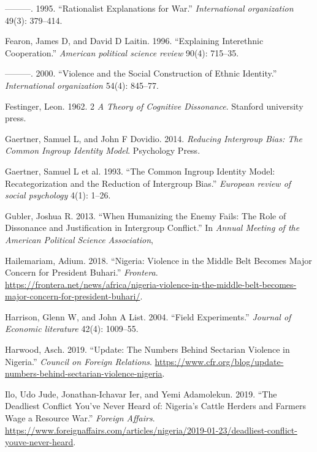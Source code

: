 \documentclass[11pt]{article}
\begin{document}
\begin{cslreferences}
\leavevmode\hypertarget{ref-fearon1995rationalist}{}%
---------. 1995. ``Rationalist Explanations for War.''
\emph{International organization} 49(3): 379--414.

\leavevmode\hypertarget{ref-fearon1996explaining}{}%
Fearon, James D, and David D Laitin. 1996. ``Explaining Interethnic
Cooperation.'' \emph{American political science review} 90(4): 715--35.

\leavevmode\hypertarget{ref-fearon2000violence}{}%
---------. 2000. ``Violence and the Social Construction of Ethnic
Identity.'' \emph{International organization} 54(4): 845--77.

\leavevmode\hypertarget{ref-festinger1962cognitiveDissonance}{}%
Festinger, Leon. 1962. 2 \emph{A Theory of Cognitive Dissonance}.
Stanford university press.

\leavevmode\hypertarget{ref-gaertner2014reducing}{}%
Gaertner, Samuel L, and John F Dovidio. 2014. \emph{Reducing Intergroup
Bias: The Common Ingroup Identity Model}. Psychology Press.

\leavevmode\hypertarget{ref-gaertner1993common}{}%
Gaertner, Samuel L et al. 1993. ``The Common Ingroup Identity Model:
Recategorization and the Reduction of Intergroup Bias.'' \emph{European
review of social psychology} 4(1): 1--26.

\leavevmode\hypertarget{ref-gubler2013humanizing}{}%
Gubler, Joshua R. 2013. ``When Humanizing the Enemy Fails: The Role of
Dissonance and Justification in Intergroup Conflict.'' In \emph{Annual
Meeting of the American Political Science Association},

\leavevmode\hypertarget{ref-frontera2018nigeria}{}%
Hailemariam, Adium. 2018. ``Nigeria: Violence in the Middle Belt Becomes
Major Concern for President Buhari.'' \emph{Frontera}.
\url{https://frontera.net/news/africa/nigeria-violence-in-the-middle-belt-becomes-major-concern-for-president-buhari/}.

\leavevmode\hypertarget{ref-harrison2004field}{}%
Harrison, Glenn W, and John A List. 2004. ``Field Experiments.''
\emph{Journal of Economic literature} 42(4): 1009--55.

\leavevmode\hypertarget{ref-council2019nigeria}{}%
Harwood, Asch. 2019. ``Update: The Numbers Behind Sectarian Violence in
Nigeria.'' \emph{Council on Foreign Relations}.
\url{https://www.cfr.org/blog/update-numbers-behind-sectarian-violence-nigeria}.

\leavevmode\hypertarget{ref-fa2019deadly}{}%
Ilo, Udo Jude, Jonathan-Ichavar Ier, and Yemi Adamolekun. 2019. ``The
Deadliest Conflict You've Never Heard of: Nigeria's Cattle Herders and
Farmers Wage a Resource War.'' \emph{Foreign Affairs}.
\url{https://www.foreignaffairs.com/articles/nigeria/2019-01-23/deadliest-conflict-youve-never-heard}.


\end{cslreferences}
\end{document}
